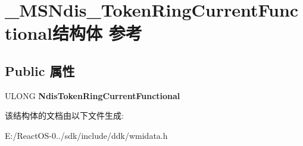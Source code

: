\hypertarget{struct___m_s_ndis___token_ring_current_functional}{}\section{\+\_\+\+M\+S\+Ndis\+\_\+\+Token\+Ring\+Current\+Functional结构体 参考}
\label{struct___m_s_ndis___token_ring_current_functional}
\subsection*{Public 属性}
\begin{DoxyCompactItemize}
\item 
\mbox{\label{struct___m_s_ndis___token_ring_current_functional_a105e76e7bb713bff78ea25372ec92b8c}} 
U\+L\+O\+NG {\bfseries Ndis\+Token\+Ring\+Current\+Functional}
\end{DoxyCompactItemize}


该结构体的文档由以下文件生成\+:\begin{DoxyCompactItemize}
\item 
E\+:/\+React\+O\+S-\/0../sdk/include/ddk/wmidata.\+h\end{DoxyCompactItemize}
